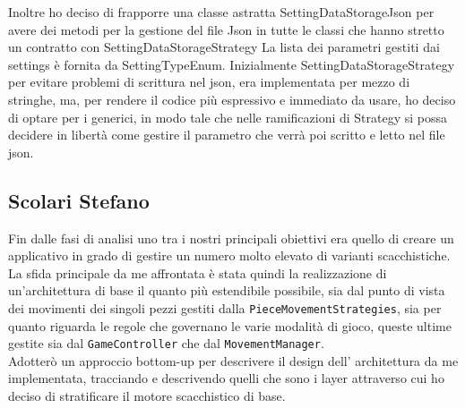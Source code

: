 \documentclass[a4paper,12pt]{report}
\begin{document}
Inoltre ho deciso di frapporre una classe astratta SettingDataStorageJson per avere dei metodi per la gestione del file Json in tutte le classi che hanno stretto un contratto con SettingDataStorageStrategy
La lista dei parametri gestiti dai settings è fornita da SettingTypeEnum.
Inizialmente SettingDataStorageStrategy per evitare problemi di scrittura nel json, era implementata per mezzo di stringhe, ma, per rendere il codice più espressivo e immediato da usare, ho deciso di optare per i generici, in modo tale che nelle ramificazioni di Strategy si possa decidere in libertà come gestire il parametro che verrà poi scritto e letto nel file json.


\clearpage
\subsection{Scolari Stefano}

Fin dalle fasi di analisi uno tra i nostri principali obiettivi era quello di creare un applicativo in grado di gestire un numero molto elevato di varianti scacchistiche.
\\
La sfida principale da me affrontata è stata quindi la realizzazione di un'architettura di base il quanto più estendibile possibile, sia dal punto di vista dei movimenti dei singoli pezzi gestiti dalla \texttt{PieceMovementStrategies}, sia per quanto riguarda le regole che governano le varie modalità di gioco, queste ultime gestite sia dal \texttt{GameController} che dal \texttt{MovementManager}.\\
Adotterò un approccio bottom-up per descrivere il design dell' architettura da me implementata, tracciando e descrivendo quelli che sono i layer attraverso cui ho deciso di stratificare il motore scacchistico di base.
%
\end{document}
